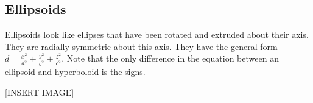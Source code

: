 \subsection{Ellipsoids}
\noindent
Ellipsoids look like ellipses that have been rotated and extruded about their axis. They are radially symmetric about this axis. They have the general form $d = \frac{x^2}{a^2} + \frac{y^2}{b^2} + \frac{z^2}{c^2}$. Note that the only difference in the equation between an ellipsoid and hyperboloid is the signs.

[INSERT IMAGE]